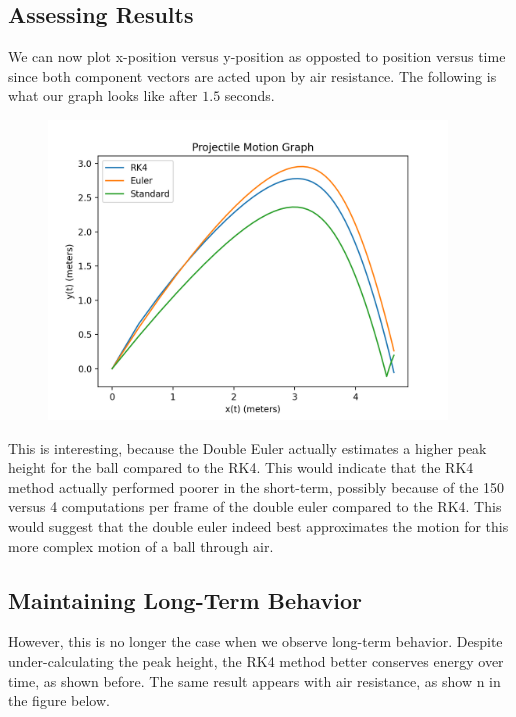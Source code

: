 \documentclass[12pt]{article}
\begin{document}
\subsection{Assessing Results}

We can now plot x-position versus y-position as opposted to position versus time since both component vectors are acted upon by air resistance. The following is what our graph looks like after $1.5$ seconds.

\begin{figure}[H]
\centering
\includegraphics[width=300pt]{img/air_1.png}
\caption{\label{fig:1}}
\end{figure}

This is interesting, because the Double Euler actually estimates a higher peak height for the ball compared to the RK4. This would indicate that the RK4 method actually performed poorer in the short-term, possibly because of the 150 versus 4 computations per frame of the double euler compared to the RK4. This would suggest that the double euler indeed best approximates the motion for this more complex motion of a ball through air. 

\subsection{Maintaining Long-Term Behavior}

However, this is no longer the case when we observe long-term behavior. Despite under-calculating the peak height, the RK4 method better conserves energy over time, as shown before. The same result appears with air resistance, as show n in the figure below. 
\end{document}
